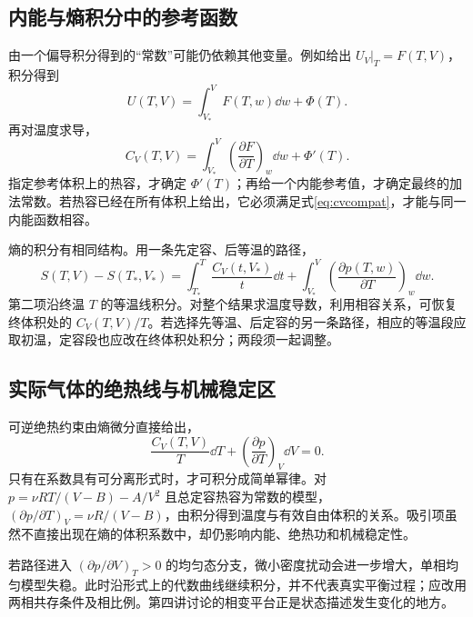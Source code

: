 \subsection{内能与熵积分中的参考函数}
由一个偏导积分得到的“常数”可能仍依赖其他变量。例如给出
$U_V|_T=F(T,V)$，积分得到
\[
 U(T,V)=\int_{V_\ast}^{V}F(T,w)\dd w+\Phi(T).
\]
再对温度求导，
\[
 C_V(T,V)=\int_{V_\ast}^{V}
 \left(\frac{\partial F}{\partial T}\right)_w\dd w+\Phi'(T).
\]
指定参考体积上的热容，才确定 $\Phi'(T)$；再给一个内能参考值，才确定最终的加法常数。若热容已经在所有体积上给出，它必须满足式\eqref{eq:cvcompat}，才能与同一内能函数相容。

熵的积分有相同结构。用一条先定容、后等温的路径，
\[
 S(T,V)-S(T_\ast,V_\ast)
 =\int_{T_\ast}^{T}\frac{C_V(t,V_\ast)}{t}\dd t
 +\int_{V_\ast}^{V}\left(\frac{\partial p(T,w)}{\partial T}\right)_w\dd w.
\]
第二项沿终温 $T$ 的等温线积分。对整个结果求温度导数，利用相容关系，可恢复终体积处的 $C_V(T,V)/T$。若选择先等温、后定容的另一条路径，相应的等温段应取初温，定容段也应改在终体积处积分；两段须一起调整。

\subsection{实际气体的绝热线与机械稳定区}
可逆绝热约束由熵微分直接给出，
\[
 \frac{C_V(T,V)}{T}\dd T+
 \left(\frac{\partial p}{\partial T}\right)_V\dd V=0.
\]
只有在系数具有可分离形式时，才可积分成简单幂律。对 $p=\nu RT/(V-B)-A/V^2$ 且总定容热容为常数的模型，
$(\partial p/\partial T)_V=\nu R/(V-B)$，由积分得到温度与有效自由体积的关系。吸引项虽然不直接出现在熵的体积系数中，却仍影响内能、绝热功和机械稳定性。

若路径进入 $(\partial p/\partial V)_T>0$ 的均匀态分支，微小密度扰动会进一步增大，单相均匀模型失稳。此时沿形式上的代数曲线继续积分，并不代表真实平衡过程；应改用两相共存条件及相比例。第四讲讨论的相变平台正是状态描述发生变化的地方。

